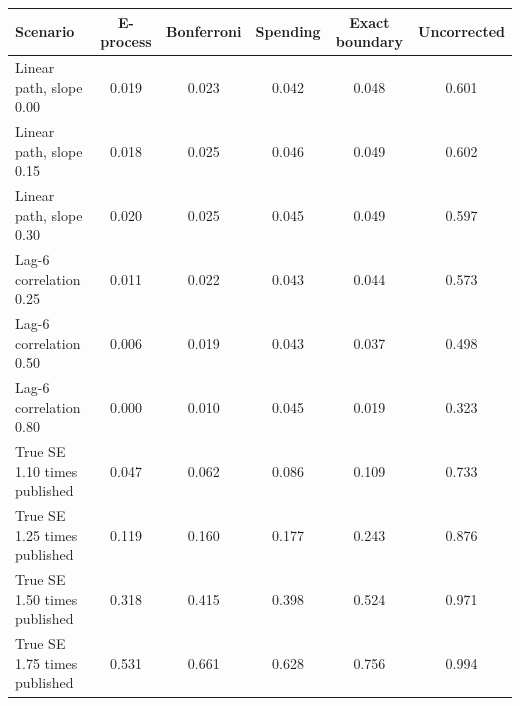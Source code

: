 \begin{tabular}{lccccc}
\toprule
Scenario & E-process & Bonferroni & Spending & Exact boundary & Uncorrected \\
\midrule
Linear path, slope 0.00 & 0.019 & 0.023 & 0.042 & 0.048 & 0.601 \\
Linear path, slope 0.15 & 0.018 & 0.025 & 0.046 & 0.049 & 0.602 \\
Linear path, slope 0.30 & 0.020 & 0.025 & 0.045 & 0.049 & 0.597 \\
\midrule
Lag-6 correlation 0.25 & 0.011 & 0.022 & 0.043 & 0.044 & 0.573 \\
Lag-6 correlation 0.50 & 0.006 & 0.019 & 0.043 & 0.037 & 0.498 \\
Lag-6 correlation 0.80 & 0.000 & 0.010 & 0.045 & 0.019 & 0.323 \\
\midrule
True SE 1.10 times published & 0.047 & 0.062 & 0.086 & 0.109 & 0.733 \\
True SE 1.25 times published & 0.119 & 0.160 & 0.177 & 0.243 & 0.876 \\
True SE 1.50 times published & 0.318 & 0.415 & 0.398 & 0.524 & 0.971 \\
True SE 1.75 times published & 0.531 & 0.661 & 0.628 & 0.756 & 0.994 \\
\bottomrule
\end{tabular}
